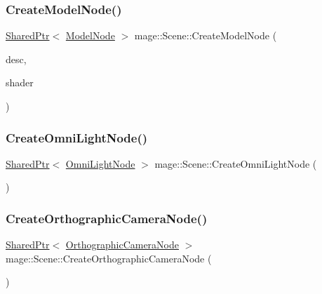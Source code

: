 \hypertarget{classmage_1_1_scene_ae21a831a792ab16b1459cfa8b65a2508}{}\label{classmage_1_1_scene_ae21a831a792ab16b1459cfa8b65a2508} 
\subsubsection{\texorpdfstring{Create\+Model\+Node()}{CreateModelNode()}\hspace{0.1cm}{\footnotesize\ttfamily [2/2]}}
{\footnotesize\ttfamily \hyperlink{namespacemage_a1e01ae66713838a7a67d30e44c67703e}{Shared\+Ptr}$<$ \hyperlink{classmage_1_1_model_node}{Model\+Node} $>$ mage\+::\+Scene\+::\+Create\+Model\+Node (\begin{DoxyParamCaption}\item[{const \hyperlink{classmage_1_1_model_descriptor}{Model\+Descriptor} \&}]{desc,  }\item[{const \hyperlink{structmage_1_1_combined_shader}{Combined\+Shader} \&}]{shader }\end{DoxyParamCaption})}

\hypertarget{classmage_1_1_scene_a370f5ce63a6277a1369c1545f0acbffa}{}\label{classmage_1_1_scene_a370f5ce63a6277a1369c1545f0acbffa} 
\subsubsection{\texorpdfstring{Create\+Omni\+Light\+Node()}{CreateOmniLightNode()}}
{\footnotesize\ttfamily \hyperlink{namespacemage_a1e01ae66713838a7a67d30e44c67703e}{Shared\+Ptr}$<$ \hyperlink{namespacemage_a1724c6e6b6b5ba535cdd967cbbb4a669}{Omni\+Light\+Node} $>$ mage\+::\+Scene\+::\+Create\+Omni\+Light\+Node (\begin{DoxyParamCaption}{ }\end{DoxyParamCaption})}

\hypertarget{classmage_1_1_scene_a9ed9e3a611434f62427c7bd4c16d2456}{}\label{classmage_1_1_scene_a9ed9e3a611434f62427c7bd4c16d2456} 
\subsubsection{\texorpdfstring{Create\+Orthographic\+Camera\+Node()}{CreateOrthographicCameraNode()}}
{\footnotesize\ttfamily \hyperlink{namespacemage_a1e01ae66713838a7a67d30e44c67703e}{Shared\+Ptr}$<$ \hyperlink{namespacemage_a7d62ab5877be3e14a9735014b77d3f55}{Orthographic\+Camera\+Node} $>$ mage\+::\+Scene\+::\+Create\+Orthographic\+Camera\+Node (\begin{DoxyParamCaption}{ }\end{DoxyParamCaption})}


